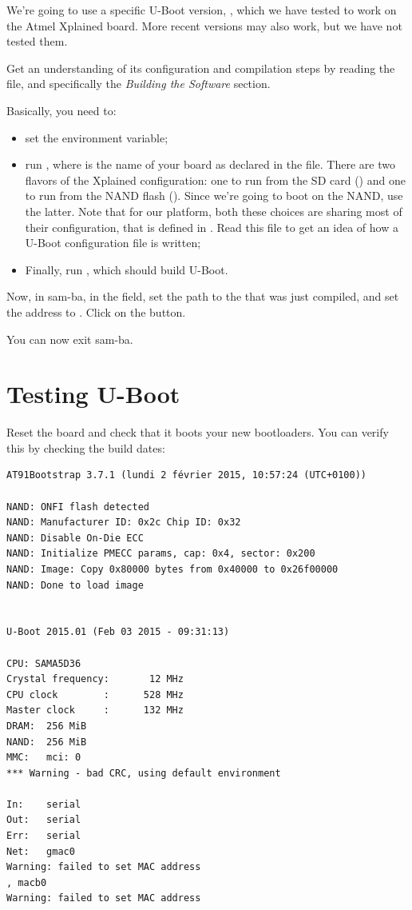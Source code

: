 We're going to use a specific U-Boot version, , which we
have tested to work on the Atmel Xplained board. More recent versions
may also work, but we have not tested them.

Get an understanding of its configuration and compilation steps by
reading the  file, and specifically the {\em Building the
  Software} section.

Basically, you need to:

\begin{itemize}

\item set the  environment variable;

\item run , where  is the name
  of your board as declared in the  file. There are
  two flavors of the Xplained configuration: one to run from the SD card
  () and one to run from the NAND flash
  (). Since we're going to boot on
  the NAND, use the latter. Note that for our platform, both these
  choices are sharing most of their configuration, that is defined in
  . Read this file to get an
  idea of how a U-Boot configuration file is written;

\item Finally, run , which should build U-Boot.

\end{itemize}

Now, in sam-ba, in the  field, set the path to
the  that was just compiled, and set the address to
. Click on the  button.

You can now exit sam-ba.

\section{Testing U-Boot}

Reset the board and check that it boots your new bootloaders. You can
verify this by checking the build dates:

\begin{verbatim}
AT91Bootstrap 3.7.1 (lundi 2 février 2015, 10:57:24 (UTC+0100))

NAND: ONFI flash detected
NAND: Manufacturer ID: 0x2c Chip ID: 0x32
NAND: Disable On-Die ECC
NAND: Initialize PMECC params, cap: 0x4, sector: 0x200
NAND: Image: Copy 0x80000 bytes from 0x40000 to 0x26f00000
NAND: Done to load image


U-Boot 2015.01 (Feb 03 2015 - 09:31:13)

CPU: SAMA5D36
Crystal frequency:       12 MHz
CPU clock        :      528 MHz
Master clock     :      132 MHz
DRAM:  256 MiB
NAND:  256 MiB
MMC:   mci: 0
*** Warning - bad CRC, using default environment

In:    serial
Out:   serial
Err:   serial
Net:   gmac0
Warning: failed to set MAC address
, macb0
Warning: failed to set MAC address
\end{verbatim}

